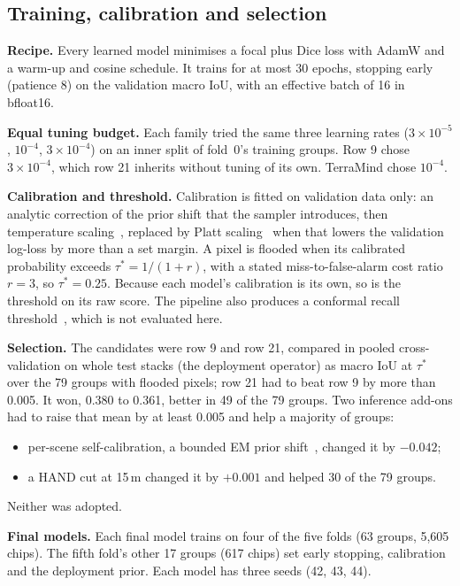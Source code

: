 \documentclass[10pt,twocolumn,a4paper]{article}
\begin{document}
\subsection{Training, calibration and selection}\label{sec:training}
\textbf{Recipe.} Every learned model minimises a focal plus Dice loss with AdamW and a warm-up and cosine schedule. It
trains for at most 30 epochs, stopping early (patience 8) on the validation macro IoU, with an effective batch of 16
in bfloat16.

\textbf{Equal tuning budget.} Each family tried the same three learning rates ($3\times10^{-5}$, $10^{-4}$,
$3\times10^{-4}$) on an inner split of fold~0's training groups. Row 9 chose $3\times10^{-4}$, which row 21
inherits without tuning of its own. TerraMind chose $10^{-4}$.

\textbf{Calibration and threshold.} Calibration is fitted on validation data only: an analytic correction of the prior
shift that the sampler introduces, then temperature scaling~\citep{guo2017calibration}, replaced by Platt scaling~\citep{platt1999}
when that lowers the validation log-loss by more than a set margin. A pixel is flooded when its calibrated
probability exceeds $\tau^{*}=1/(1+r)$, with a stated miss-to-false-alarm cost ratio $r=3$, so $\tau^{*}=0.25$.
Because each model's calibration is its own, so is the threshold on its raw score. The pipeline also produces a
conformal recall threshold~\citep{angelopoulos2022crc}, which is not evaluated here.

\textbf{Selection.} The candidates were row 9 and row 21, compared in pooled cross-validation on whole test stacks (the
deployment operator) as macro IoU at $\tau^{*}$ over the 79 groups with flooded pixels; row 21 had to beat row 9 by
more than 0.005. It won, 0.380 to 0.361, better in 49 of the 79 groups. Two inference add-ons had to raise that mean by at least 0.005 and help a majority of
groups:
\begin{itemize}
  \item per-scene self-calibration, a bounded EM prior shift~\citep{saerens2002prior}, changed it by $-0.042$;
  \item a HAND cut at 15\,m changed it by $+0.001$ and helped 30 of the 79 groups.
\end{itemize}
Neither was adopted.

\textbf{Final models.} Each final model trains on four of the five folds (63 groups, 5,605 chips). The fifth fold's
other 17 groups (617 chips) set early stopping, calibration and the deployment prior. Each model has three seeds (42,
43, 44).
\end{document}
